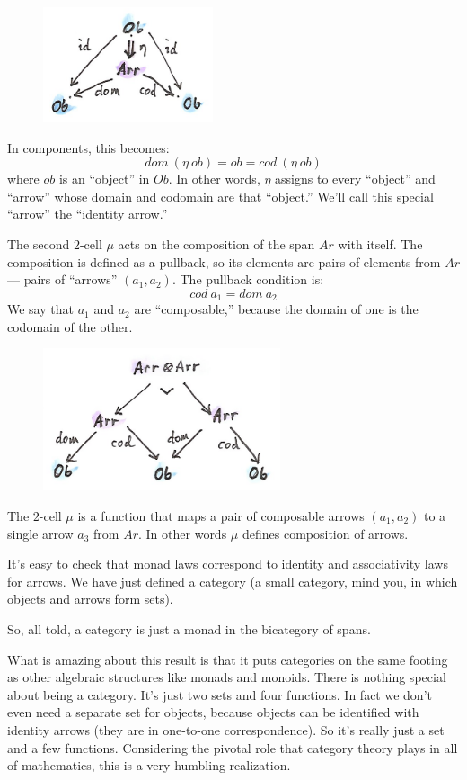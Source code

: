 \begin{figure}[H]
\centering
\includegraphics[width=50mm]{images/spanunit.png}
\end{figure}

\noindent
In components, this becomes:
\[dom\ (\eta\ ob) = ob = cod\ (\eta\ ob)\]
where $ob$ is an ``object'' in $Ob$. In other words,
$\eta$ assigns to every ``object'' and ``arrow'' whose domain and
codomain are that ``object.'' We'll call this special ``arrow'' the
``identity arrow.''

The second $2$-cell $\mu$ acts on the composition of the span
$Ar$ with itself. The composition is defined as a pullback, so
its elements are pairs of elements from $Ar$ --- pairs of
``arrows'' $(a_1, a_2)$. The pullback condition is:
\[cod\ a_1 = dom\ a_2\]
We say that $a_1$ and $a_2$ are ``composable,'' because the
domain of one is the codomain of the other.

\begin{figure}[H]
\centering
\includegraphics[width=2.75000in]{images/spanmul.png}
\end{figure}

\noindent
The $2$-cell $\mu$ is a function that maps a pair of composable
arrows $(a_1, a_2)$ to a single arrow $a_3$ from
$Ar$. In other words $\mu$ defines composition of arrows.

It's easy to check that monad laws correspond to identity and
associativity laws for arrows. We have just defined a category (a small
category, mind you, in which objects and arrows form sets).

So, all told, a category is just a monad in the bicategory of spans.

What is amazing about this result is that it puts categories on the same
footing as other algebraic structures like monads and monoids. There is
nothing special about being a category. It's just two sets and four
functions. In fact we don't even need a separate set for objects,
because objects can be identified with identity arrows (they are in
one-to-one correspondence). So it's really just a set and a few
functions. Considering the pivotal role that category theory plays in
all of mathematics, this is a very humbling realization.

